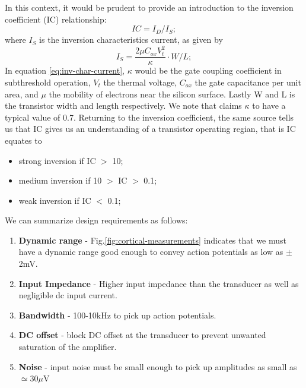In this context, it would be prudent to provide an introduction to the inversion coefficient (IC) relationship:
    \begin{equation} 
    \label{eq:IC}
      IC=I_D/I_S;
    \end{equation}
where $I_S$ is the inversion characteristics current, as given by
    \begin{equation} 
    \label{eq:inv-char-current}
      I_S= \frac{2 \mu C_{ox} V_t^2}{ \kappa } \cdot W/L;
    \end{equation}
In equation \ref{eq:inv-char-current}, $\kappa$ would be the gate coupling coefficient in subthreshold operation, $V_t$ the thermal voltage, $C_{ox}$ the gate capacitance per unit area, and $\mu$ the mobility of electrons near the silicon surface. Lastly W and L is the transistor width and length respectively. We note that \cite{harrison2003low} claims $\kappa$ to have a typical value of 0.7. Returning to the inversion coefficient, the same 
source tells us that IC gives us an understanding of a transistor operating regian, that is IC equates to

		    \begin{itemize}
    		    \item strong inversion if IC $>$ 10;
    		    \item medium inversion if 10 $>$ IC $>$ 0.1;
    		    \item weak inversion if IC $<$ 0.1;
		    \end{itemize}

We can summarize design requirements as follows:

\begin{enumerate}
  \item\textbf{Dynamic range} - Fig.\ref{fig:cortical-measurements} indicates that we must have a dynamic range good enough to convey action potentials as low as $\pm$2mV.
  \item\textbf{Input Impedance} - Higher input impedance than the transducer as well as negligible dc input current.
  \item\textbf{Bandwidth} - 100-10kHz to pick up action potentials.
  \item\textbf{DC offset} - block DC offset at the transducer to prevent unwanted saturation of the amplifier.
  \item\textbf{Noise} - input noise must be small enough to pick up amplitudes as small as $\simeq$30$\mu$V
\end{enumerate}


